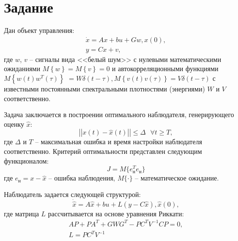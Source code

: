 \documentclass[14pt, a4paper]{extarticle}
\begin{document}
	\onehalfspacing
	
	\setcounter{page}{2}
	
	\section*{Задание}
	
	Дан объект управления:
	$$\begin{matrix}
		\dot{x} = Ax + bu + Gw, x(0),\\
		y = Cx + v,
	\end{matrix}$$
	где $w$, $v$ -- сигналы вида <<белый шум>> с нулевыми математическими ожиданиями $M\left\{w\right\}=M\left\{v\right\}=0$ и автокорреляционными функциями $M\left\{w(t)w^T(\tau)\right\}$ $= W\delta(t-\tau), M\left\{v(t)v(\tau)\right\} = V\delta(t-\tau)$ с известными постоянными спектральными плотностями (энергиями) $W$ и $V$ соответственно.
	
	Задача заключается в построении оптимального наблюдателя, генерирующего оценку $\hat{x}$:
	$$\left|\left|x(t) - \hat{x}(t)\right|\right| \le \Delta ~~~ \forall t \ge T,$$
	где $\Delta$ и $T$ -- максимальная ошибка и время настройки наблюдателя соответственно. Критерий оптимальности представлен следующим функционалом:
	$$J = M\{e_\text{н}^Te_\text{н}\}$$
	где $e_\text{н} = x - \hat{x}$ -- ошибка наблюдения, $M\{\cdot\}$ -- математическое ожидание.
	
	Наблюдатель задается следующей структурой:
	$$\dot{\hat{x}} = A\hat{x} + bu + L(y - C\hat{x}), \hat{x}(0),$$
	где матрица $L$ рассчитывается на основе уравнения Риккати:
	$$\begin{matrix}
		AP + PA^T + GWG^T - PC^TV^{-1}CP = 0,\\
		L = PC^TV^{-1}
	\end{matrix}$$
	
\end{document}

